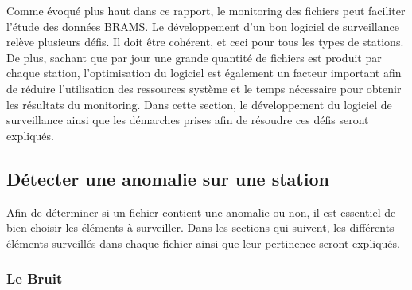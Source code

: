 \documentclass[11pt]{article}
\begin{document}
Comme évoqué plus haut dans ce rapport, le monitoring des fichiers peut faciliter l'étude des données BRAMS.
Le développement d'un bon logiciel de surveillance relève plusieurs défis.
Il doit être cohérent, et ceci pour tous les types de stations.
De plus, sachant que par jour une grande quantité de fichiers est produit par chaque station, l'optimisation du logiciel est également un facteur important afin de réduire l'utilisation des ressources système et le temps nécessaire pour obtenir les résultats du monitoring.
Dans cette section, le développement du logiciel de surveillance ainsi que les démarches prises afin de résoudre ces défis seront expliqués.

\subsection{Détecter une anomalie sur une station}

Afin de déterminer si un fichier contient une anomalie ou non, il est essentiel de bien choisir les éléments à surveiller.
Dans les sections qui suivent, les différents éléments surveillés dans chaque fichier ainsi que leur pertinence seront expliqués.

\subsubsection{Le Bruit}
\end{document}
